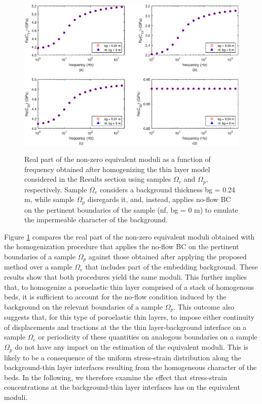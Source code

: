 \documentclass[draft]{agujournal2019}
\begin{document}
\begin{figure}[!ht]
\centering
        \includegraphics[width= 120mm, height=80mm]{Figure5.eps}
\caption{Real part of the non-zero equivalent moduli as a function of frequency obtained after homogenizing the thin layer model considered in the Results section using samples $\Omega_e$ and  $\Omega_p$, respectively. Sample $\Omega_e$ considers a background thickness bg = 0.24 m, while sample $\Omega_p$ disregards it, and, instead, applies no-flow BC on the pertinent boundaries of the sample (nf, bg = 0 m) to emulate the impermeable character of the background.}
\label{fig.5}
\end{figure}

Figure \ref{fig.5} compares the real part of the non-zero equivalent moduli obtained with the homogenization procedure that applies the no-flow BC on the pertinent boundaries of a sample $\Omega_p$ against those obtained after applying the proposed method over a sample $\Omega_e$ that includes part of the embedding background. These results show that both procedures yield the same moduli. This further implies that, to homogenize a poroelastic thin layer comprised of a stack of homogenous beds, it is sufficient to account for the no-flow condition induced by the background on the relevant boundaries of a sample $\Omega_p$. This outcome also suggests that, for this type of poroelastic thin layers, to impose either continuity of displacements and tractions at the the thin layer-background interface on a sample $\Omega_e$ or periodicity of these quantities on analogous boundaries on a sample $\Omega_p$ do not have any impact on the estimation of the equivalent moduli.
This is likely to be a consequence of the uniform stress-strain distribution along the background-thin layer interfaces resulting from the homogeneous character of the beds. In the following, we therefore examine the effect that stress-strain concentrations at the background-thin layer interfaces has on the equivalent moduli.
\end{document}
